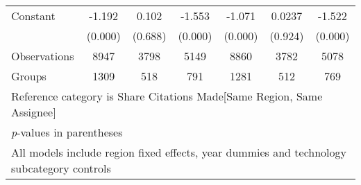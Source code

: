 \begin{table}[htbp]
\begin{tabular}{l*{6}{c}}
Constant        &   -1.192&    0.102&   -1.553&   -1.071&   0.0237&   -1.522\\
                &  (0.000)&  (0.688)&  (0.000)&  (0.000)&  (0.924)&  (0.000)\\
\hline
Observations    &     8947&     3798&     5149&     8860&     3782&     5078\\
Groups          &     1309&      518&      791&     1281&      512&      769\\
\hline\hline
\multicolumn{7}{l}{\footnotesize Reference category is Share Citations Made[Same Region, Same Assignee]}\\
\multicolumn{7}{l}{\footnotesize \textit{p}-values in parentheses}\\
\multicolumn{7}{l}{\footnotesize All models include region fixed effects, year dummies and technology subcategory controls}\\
\end{tabular}
\end{table}
